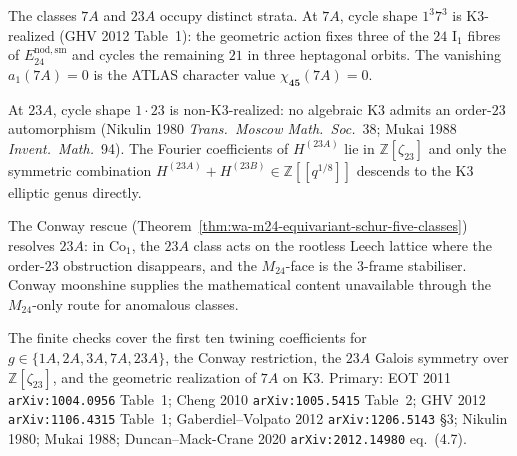 \begin{remark}%
\label{rem:wa-anomalous-classes}%
The classes $7A$ and $23A$ occupy distinct strata. At $7A$,
cycle shape $1^3 7^3$ is K3-realized (GHV 2012 Table~1):
the geometric action fixes three of the $24$ I$_1$ fibres
of $E^{\mathrm{nod,sm}}_{24}$ and cycles the remaining $21$
in three heptagonal orbits. The vanishing $a_1(7A) = 0$ is
the ATLAS character value $\chi_{\mathbf{45}}(7A) = 0$.

At $23A$, cycle shape $1 \cdot 23$ is non-K3-realized:
no algebraic K3 admits an order-$23$ automorphism
(Nikulin 1980 \emph{Trans.\ Moscow Math.\ Soc.}~38;
Mukai 1988 \emph{Invent.\ Math.}~94). The Fourier
coefficients of $H^{(23A)}$ lie in $\mathbb Z[\zeta_{23}]$
and only the symmetric combination
$H^{(23A)} + H^{(23B)} \in \mathbb Z[[q^{1/8}]]$ descends
to the K3 elliptic genus directly.

The Conway rescue
(Theorem~\ref{thm:wa-m24-equivariant-schur-five-classes})
resolves $23A$: in $\mathrm{Co}_1$, the $23A$ class acts on
the rootless Leech lattice where the order-$23$ obstruction
disappears, and the $M_{24}$-face is the $3$-frame
stabiliser. Conway moonshine supplies the mathematical
content unavailable through the $M_{24}$-only route for
anomalous classes.

The finite checks cover the first ten twining coefficients for
$g \in \{1A, 2A, 3A, 7A, 23A\}$, the Conway restriction, the $23A$
Galois symmetry over $\mathbb Z[\zeta_{23}]$, and the geometric
realization of $7A$ on K3.
Primary: EOT 2011 \texttt{arXiv:1004.0956} Table~1;
Cheng 2010 \texttt{arXiv:1005.5415} Table~2;
GHV 2012 \texttt{arXiv:1106.4315} Table~1;
Gaberdiel--Volpato 2012 \texttt{arXiv:1206.5143} \S 3;
Nikulin 1980; Mukai 1988;
Duncan--Mack-Crane 2020 \texttt{arXiv:2012.14980} eq.~(4.7).
\end{remark}

